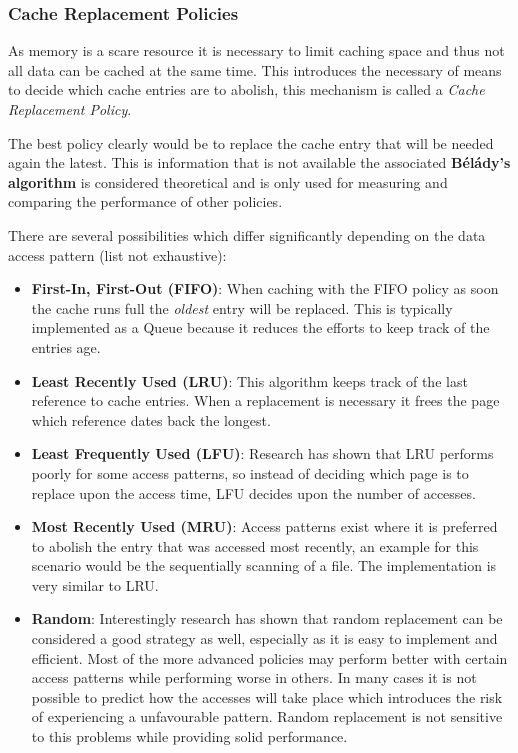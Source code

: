 \subsubsection{Cache Replacement Policies}
As memory is a scare resource it is necessary to limit caching space and thus not all data can be cached at the same time. This introduces the necessary of means to decide which cache entries are to abolish, this mechanism is called a \emph{Cache Replacement Policy}. 

The best policy clearly would be to replace the cache entry that will be needed again the latest. This is information that is not available the associated \textbf{Bélády's algorithm} is considered theoretical and is only used for measuring and comparing the performance of other policies.

There are several possibilities which differ significantly depending on the data access pattern (list not exhaustive):
\begin{itemize}
	\item \textbf{First-In, First-Out (FIFO)}: When caching with the FIFO policy as soon the cache runs full the \emph{oldest} entry will be replaced. This is typically implemented as a Queue because it reduces the efforts to keep track of the entries age.
	\item \textbf{Least Recently Used (LRU)}: This algorithm keeps track of the last reference to cache entries. When a replacement is necessary it frees the page which reference dates back the longest. 
	\item \textbf{Least Frequently Used (LFU)}: Research has shown that LRU performs poorly for some access patterns, so instead of deciding which page is to replace upon the access time, LFU decides upon the number of accesses.
	\item \textbf{Most Recently Used (MRU)}: Access patterns exist where it is preferred to abolish the entry that was accessed most recently, an example for this scenario would be the sequentially scanning of a file. The implementation is very similar to LRU.
	\item \textbf{Random}: Interestingly research has shown that random replacement can be considered a good strategy as well, especially as it is easy to implement and efficient. Most of the more advanced policies may perform better with certain access patterns while performing worse in others. In many cases it is not possible to predict how the accesses will take place which introduces the risk of experiencing a unfavourable pattern. Random replacement is not sensitive to this problems while providing solid performance.
\end{itemize}

